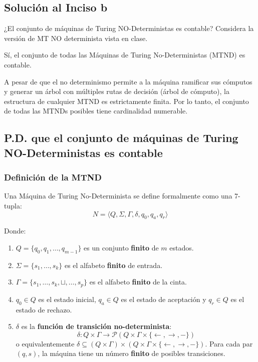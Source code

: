 \subsection{Solución al Inciso b}

\begin{tcolorbox}[enunciado]
    ¿El conjunto de máquinas de Turing NO-Deterministas es contable? Considera la versión de MT NO determinista vista en clase.
\end{tcolorbox}

Sí, el conjunto de todas las Máquinas de Turing No-Deterministas (MTND) es contable. 

A pesar de que el no determinismo permite a la máquina ramificar sus cómputos y generar un árbol con múltiples rutas de decisión (árbol de cómputo), la estructura de cualquier MTND es estrictamente finita. Por lo tanto, el conjunto de todas las MTNDs posibles tiene cardinalidad numerable.

\subsection*{P.D. que el conjunto de máquinas de Turing NO-Deterministas es contable}

\subsubsection*{Definición de la MTND}
Una Máquina de Turing No-Determinista se define formalmente como una 7-tupla:
\[
    N = \langle Q, \Sigma, \Gamma, \delta, q_0, q_a, q_r \rangle
\]

\noindent Donde:
\begin{enumerate}
    \item \(Q = \{q_0, q_1, \dots, q_{m-1}\}\) es un conjunto \textbf{finito} de \(m\) estados.
    \item \(\Sigma = \{s_1, \dots, s_k\}\) es el alfabeto \textbf{finito} de entrada.
    \item \(\Gamma = \{s_1, \dots, s_k, \sqcup, \dots, s_p\}\) es el alfabeto \textbf{finito} de la cinta.
    \item \(q_0 \in Q\) es el estado inicial, \(q_a \in Q\) es el estado de aceptación y \(q_r \in Q\) es el estado de rechazo.
    \item \(\delta\) es la \textbf{función de transición no-determinista}:
    \[
        \delta : Q \times \Gamma \to \mathcal{P}(Q \times \Gamma \times \{\leftarrow, \rightarrow, -\})
    \]
    o equivalentemente \(\delta \subseteq (Q \times \Gamma) \times (Q \times \Gamma \times \{\leftarrow, \rightarrow, -\})\). Para cada par \((q, s)\), la máquina tiene un número \textbf{finito} de posibles transiciones.
\end{enumerate}


